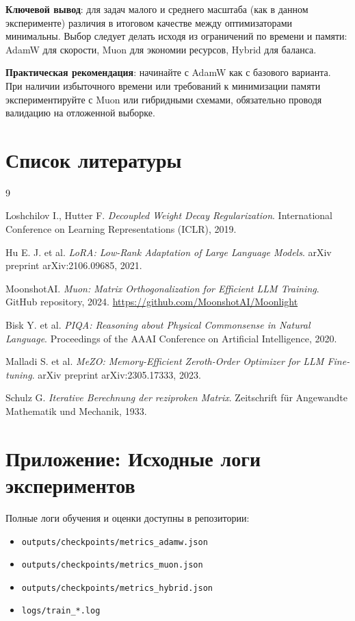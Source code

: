 \documentclass[a4paper,12pt]{article}
\begin{document}
\textbf{Ключевой вывод}: для задач малого и среднего масштаба (как в данном эксперименте) различия в итоговом качестве между оптимизаторами минимальны. Выбор следует делать исходя из ограничений по времени и памяти: AdamW для скорости, Muon для экономии ресурсов, Hybrid для баланса.

\textbf{Практическая рекомендация}: начинайте с AdamW как с базового варианта. При наличии избыточного времени или требований к минимизации памяти экспериментируйте с Muon или гибридными схемами, обязательно проводя валидацию на отложенной выборке.

\section*{Список литературы}
\label{sec:references}

\begin{thebibliography}{9}

Loshchilov I., Hutter F. 
\textit{Decoupled Weight Decay Regularization}. 
International Conference on Learning Representations (ICLR), 2019.

Hu E. J. et al. 
\textit{LoRA: Low-Rank Adaptation of Large Language Models}. 
arXiv preprint arXiv:2106.09685, 2021.

MoonshotAI. 
\textit{Muon: Matrix Orthogonalization for Efficient LLM Training}. 
GitHub repository, 2024. 
\url{https://github.com/MoonshotAI/Moonlight}

Bisk Y. et al. 
\textit{PIQA: Reasoning about Physical Commonsense in Natural Language}. 
Proceedings of the AAAI Conference on Artificial Intelligence, 2020.

Malladi S. et al. 
\textit{MeZO: Memory-Efficient Zeroth-Order Optimizer for LLM Fine-tuning}. 
arXiv preprint arXiv:2305.17333, 2023.

Schulz G. 
\textit{Iterative Berechnung der reziproken Matrix}. 
Zeitschrift für Angewandte Mathematik und Mechanik, 1933.

\end{thebibliography}

\appendix
\section*{Приложение: Исходные логи экспериментов}

Полные логи обучения и оценки доступны в репозитории:
\begin{itemize}
    \item \texttt{outputs/checkpoints/metrics\_adamw.json}
    \item \texttt{outputs/checkpoints/metrics\_muon.json}
    \item \texttt{outputs/checkpoints/metrics\_hybrid.json}
    \item \texttt{logs/train\_*.log}
\end{itemize}
\end{document}
